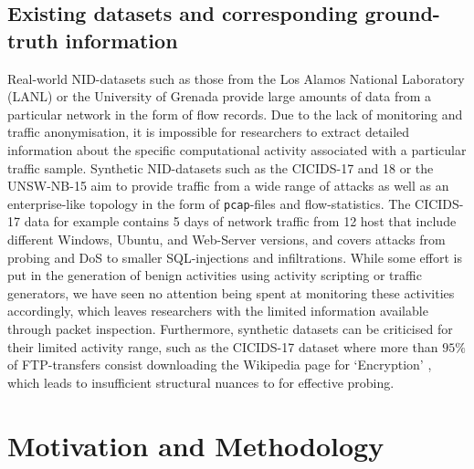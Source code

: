 \documentclass[runningheads]{llncs}
\begin{document}
\subsection{Existing datasets and corresponding ground-truth information}\label{Sec:ExData}

Real-world NID-datasets such as those from the Los Alamos National Laboratory \cite{kent-2015-cyberdata1} (LANL) or the University of Grenada \cite{macia2018ugr} provide large amounts of data from a particular network in the form of flow records. Due to the lack of monitoring and traffic anonymisation, it is impossible for researchers to extract detailed information about the specific computational activity associated with a particular traffic sample.
Synthetic NID-datasets such as the CICIDS-17 and 18 \cite{sharafaldin2018toward} or the UNSW-NB-15 \cite{moustafa2015unsw} aim to provide traffic from a wide range of attacks as well as an enterprise-like topology in the form of \texttt{pcap}-files and flow-statistics. The CICIDS-17 data for example contains 5 days of network traffic from 12 host that include different Windows, Ubuntu, and Web-Server versions, and covers attacks from probing and DoS to smaller SQL-injections and infiltrations.
While some effort is put in the generation of benign activities using activity scripting or traffic generators, we have seen no attention being spent at monitoring these activities accordingly, which leaves researchers with the limited information available through packet inspection. Furthermore, synthetic datasets can be criticised for their limited activity range, such as the CICIDS-17 dataset where more than $95\%$ of FTP-transfers consist downloading the Wikipedia page for ‘Encryption’ \cite{ring2019survey}, which leads to insufficient structural nuances to for effective probing.


\section{Motivation and Methodology}\label{Sec:Motivation}




\end{document}
